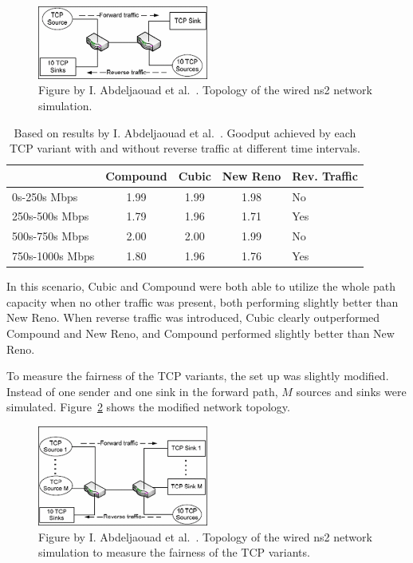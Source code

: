 \begin{figure}
	\includegraphics[width=0.5\textwidth]{images/abdeljaouad10_topology_1.png}
	\caption{Figure by I. Abdeljaouad et al.~\cite{Abdeljaouad10}. Topology of the wired ns2 network simulation.}
	\label{fig:topology1}
\end{figure}

\begin{table}
\small
\begin{tabular}{l*{3}{c}l}
& Compound & Cubic & New Reno & Rev. Traffic \\
\hline
0s-250s Mbps & 1.99 & 1.99 & 1.98 & No \\
250s-500s Mbps & 1.79 & 1.96 & 1.71 & Yes \\
500s-750s Mbps & 2.00 & 2.00 & 1.99 & No \\
750s-1000s Mbps & 1.80 & 1.96 & 1.76 & Yes \\
\end{tabular}
\caption{Based on results by I. Abdeljaouad et al.~\cite{Abdeljaouad10}. Goodput achieved by each TCP variant with and without reverse traffic at different time intervals.}
\label{tab:goodput1}
\end{table}

In this scenario, Cubic and Compound were both able to utilize the whole path capacity when no other traffic was present, both performing slightly better than New Reno. When reverse traffic was introduced, Cubic clearly outperformed Compound and New Reno, and Compound performed slightly better than New Reno.  

To measure the fairness of the TCP variants, the set up was slightly modified. Instead of one sender and one sink in the forward path, $M$ sources and sinks were simulated. Figure~\ref{fig:topology2} shows the modified network topology.

\begin{figure}
	\includegraphics[width=0.5\textwidth]{images/abdeljaouad10_topology_2.png}
	\caption{Figure by I. Abdeljaouad et al.~\cite{Abdeljaouad10}. Topology of the wired ns2 network simulation to measure the fairness of the TCP variants.}
	\label{fig:topology2}
\end{figure}

